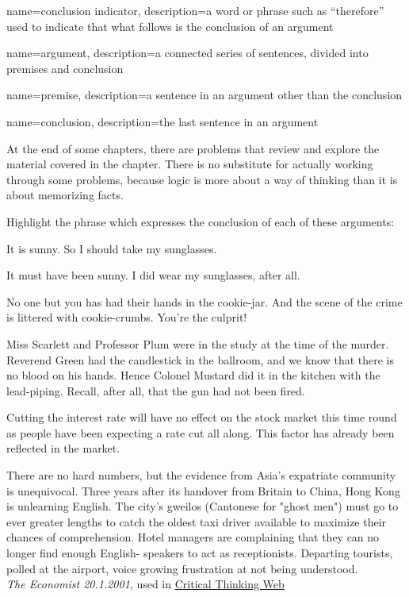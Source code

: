 {
name=conclusion indicator,
description={a word or phrase such as ``therefore'' used to indicate that what follows is the conclusion of an argument}
}

{
name=argument,
description={a connected series of sentences, divided into \gls{premise}s and \gls{conclusion}}
}

{
name=premise,
description={a sentence in an \gls{argument} other than the \gls{conclusion}}
}

{
name=conclusion,
description={the last sentence in an \gls{argument}}
}





\practiceproblems
At the end of some chapters, there are problems that review and explore the material covered in the chapter. There is no substitute for actually working through some problems, because logic is more about a way of thinking than it is about memorizing facts.

\medskip

Highlight the phrase which expresses the conclusion of each of these arguments:
\begin{earg}
	\item It is sunny. So I should take my sunglasses.
	\item It must have been sunny. I did wear my sunglasses, after all.
	\item No one but you has had their hands in the cookie-jar. And the scene of the crime is littered with cookie-crumbs. You're the culprit!
	\item Miss Scarlett and Professor Plum were in the study at the time of the murder. Reverend Green had the candlestick in the ballroom, and we know that there is no blood on his hands. Hence Colonel Mustard did it in the kitchen with the lead-piping. Recall, after all, that the gun had not been fired.
	\item Cutting the interest rate will have no effect on the stock market this time round as people have been expecting a rate cut all along. This factor has already been reflected in the market.
	\item There are no hard numbers, but the evidence from Asia's expatriate community is unequivocal. Three years after its handover from Britain to China, Hong Kong is unlearning English. The city's gweilos (Cantonese for "ghost men") must go to ever greater lengths to catch the oldest taxi driver available to maximize their chances of comprehension. Hotel managers are complaining that they can no longer find enough English- speakers to act as receptionists. Departing tourists, polled at the airport, voice growing frustration at not being understood. \\ \emph{The Economist 20.1.2001}, used in \href{https://philosophy.hku.hk/think/arg/arg.php}{Critical Thinking Web}
\end{earg}


